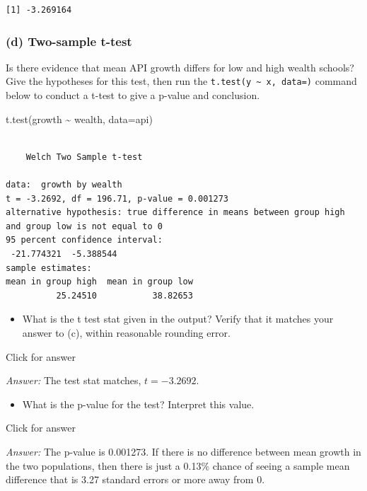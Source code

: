 \documentclass[
]{book}
\newenvironment{Shaded}{\begin{snugshade}}{\end{snugshade}}
\newcommand{\AttributeTok}[1]{\textcolor[rgb]{0.77,0.63,0.00}{#1}}
\newcommand{\FunctionTok}[1]{\textcolor[rgb]{0.00,0.00,0.00}{#1}}
\newcommand{\NormalTok}[1]{#1}
\newcommand{\SpecialCharTok}[1]{\textcolor[rgb]{0.00,0.00,0.00}{#1}}
\providecommand{\tightlist}{%
  \setlength{\itemsep}{0pt}\setlength{\parskip}{0pt}}
\begin{document}
\begin{verbatim}
[1] -3.269164
\end{verbatim}

\hypertarget{d-two-sample-t-test-1}{%
\subsubsection{(d) Two-sample t-test}\label{d-two-sample-t-test-1}}

Is there evidence that mean API growth differs for low and high wealth schools? Give the hypotheses for this test, then run the \texttt{t.test(y\ \textasciitilde{}\ x,\ data=)} command below to conduct a t-test to give a p-value and conclusion.

\begin{Shaded}
\begin{Highlighting}[]
\FunctionTok{t.test}\NormalTok{(growth }\SpecialCharTok{\textasciitilde{}}\NormalTok{ wealth, }\AttributeTok{data=}\NormalTok{api)}
\end{Highlighting}
\end{Shaded}

\begin{verbatim}

    Welch Two Sample t-test

data:  growth by wealth
t = -3.2692, df = 196.71, p-value = 0.001273
alternative hypothesis: true difference in means between group high and group low is not equal to 0
95 percent confidence interval:
 -21.774321  -5.388544
sample estimates:
mean in group high  mean in group low 
          25.24510           38.82653 
\end{verbatim}

\begin{itemize}
\tightlist
\item
  What is the t test stat given in the output? Verify that it matches your answer to (c), within reasonable rounding error.
\end{itemize}

Click for answer

\emph{Answer:} The test stat matches, \(t = -3.2692\).

\begin{itemize}
\tightlist
\item
  What is the p-value for the test? Interpret this value.
\end{itemize}

Click for answer

\emph{Answer:} The p-value is 0.001273. If there is no difference between mean growth in the two populations, then there is just a 0.13\% chance of seeing a sample mean difference that is 3.27 standard errors or more away from 0.
\end{document}
